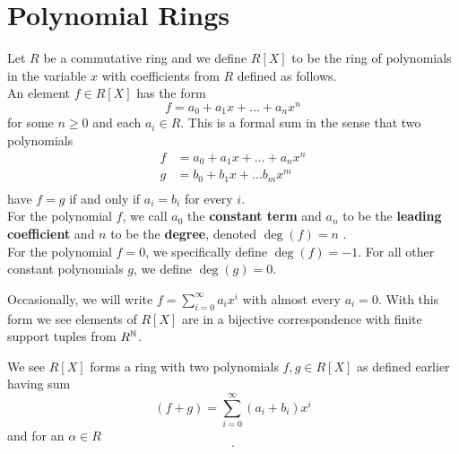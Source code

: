 \section{Polynomial Rings}
\begin{definition}
	Let \(R\) be a commutative ring and we define \(R\left[ X \right] \) to be the ring of polynomials in the variable \(x\) with coefficients from \(R\) defined as follows.\\
	An element \(f \in R\left[ X \right] \) has the form \[
	f = a_0 + a_1x + \ldots + a_{n} x^{n}
	\] for some \(n \ge 0\) and each \(a_{i} \in R\). This is a formal sum in the sense that two polynomials
	\begin{align*}
		f&= a_0 + a_1x + \ldots + a_{n}x^{n} \\
		g&= b_0 + b_1 x + \ldots b_{m} x^{m}  \\
	\end{align*} have \(f = g\) if and only if \(a_{i} = b_{i}\) for every \(i\).\\
For the polynomial \(f\), we call \(a_0\) the \textbf{constant term} and \(a_{n}\) to be the \textbf{leading coefficient} and \(n\) to be the \textbf{degree}, denoted \(\deg \left( f \right) = n\) .\\
For the polynomial \(f = 0\), we specifically define \(\deg \left(  f \right) = -1\). For all other constant polynomials \(g\), we define \(\deg \left( g \right) = 0\).
\end{definition}
\begin{remark}
	Occasionally, we will write \(f = \sum_{i=0}^{\infty} a_{i} x^{i}\) with almost every \(a_{i} = 0\). With this form we see elements of \(R\left[ X \right] \) are in a bijective correspondence with finite support tuples from \(R^{\mathbb{N}}\).
\end{remark}
We see \(R\left[ X \right] \) forms a ring with two polynomials \(f, g \in R\left[ X \right] \) as defined earlier having sum \[
	\left( f + g \right)  = \sum_{i=0}^{\infty} \left( a_{i} + b_{i} \right) x^{i}
\] and for an \(\alpha \in R\)  \[

.\]
